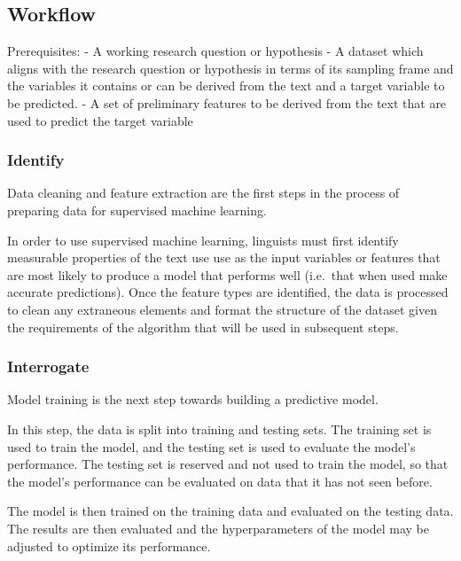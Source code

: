 \documentclass[
  letterpaper,
]{latex/krantz}
\begin{document}
\hypertarget{pda-workflow}{%
\subsection{Workflow}\label{pda-workflow}}

Prerequisites: - A working research question or hypothesis - A dataset
which aligns with the research question or hypothesis in terms of its
sampling frame and the variables it contains or can be derived from the
text and a target variable to be predicted. - A set of preliminary
features to be derived from the text that are used to predict the target
variable

\hypertarget{pda-identify}{%
\subsubsection{Identify}\label{pda-identify}}

Data cleaning and feature extraction are the first steps in the process
of preparing data for supervised machine learning.

In order to use supervised machine learning, linguists must first
identify measurable properties of the text use use as the input
variables or features that are most likely to produce a model that
performs well (i.e.~that when used make accurate predictions). Once the
feature types are identified, the data is processed to clean any
extraneous elements and format the structure of the dataset given the
requirements of the algorithm that will be used in subsequent steps.

\hypertarget{pda-interrogate}{%
\subsubsection{Interrogate}\label{pda-interrogate}}

Model training is the next step towards building a predictive model.

In this step, the data is split into training and testing sets. The
training set is used to train the model, and the testing set is used to
evaluate the model's performance. The testing set is reserved and not
used to train the model, so that the model's performance can be
evaluated on data that it has not seen before.

The model is then trained on the training data and evaluated on the
testing data. The results are then evaluated and the hyperparameters of
the model may be adjusted to optimize its performance.
\end{document}
